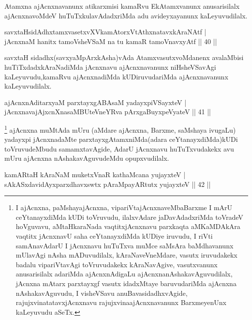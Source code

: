 \begin{artha}
Atamxna ajAcnxnavanunx atikarxmisi kamaRvu EkAtamxvanunx anusarisilalx ajAcnxnavoMdeV huTuTxkulavAdadxriMda adu avideyxayanunx kaLeyuvudilalx.
\end{artha}

\begin{shl}
savxtaHsidAdhxtamxvasetxvXVkamAtorxVtAthxnatavxkAraNAtf |\\
jAcnxnaM hanitx tamoV\s sheVSaM na tu kamaR tamoVnavxyAtf \hfill || 40 ||
\end{shl}

\begin{artha}
savxtaH sidadhx(savxyaMpArxkAsha)vAda AtamxvasutxvoMdanenx avalaMbisi huTiTxdadxkAraNadiMda jAcnxnavu ajAcnxnavanunx niHsheVSavAgi kaLeyuvudu,kamaRvu ajAcnxnadiMda kUDiruvudariMda ajAcnxnavanunx kaLeyuvudilalx.
\end{artha}

\begin{shl}
ajAcnxnAditarxyaM parxtayxgABAsaM yadayxpiVSayxteV |\\
jAcnxnavajAjxcnXnasaMBUteVneYRva pArxgaBuyxpeVyateV \hfill || 41 ||
\end{shl}

\begin{artha}
\footnote{I ajAcnxna, paMshayajAcnxna, vipariVtajAcnxnaveMbaBarxme I mArU ceYtanayxdiMda kUDi toVruvudu, ilalxvAdare jaDavAdadxriMda toVradeV hoVguvavu, aMtaHkaraNada vaqtitxjAcnxnavu parxkaqta aMKaMDAkAra vaqtitx jAcnxnavU saha ceYtanayxdiMda kUDiye iruvudu, I riVti samAnavAdarU I jAcnxnavu huTuTxva muMce saMsAra baMdhavanunx mUlavAgi nAsha mADuvudilalx, kAraNaveVneMdare, vasutx iruvudakekx badalu vipariVtavAgi toVruvudakekx kAraNavAgive, vasutxvanunx anusarisilalx adariMda ajAcnxnAdigaLu ajAcnxnanAshakavAguvudilalx, jAcnxna  mAtarx parxtayxgf vasutx idadxMtaye baruvudariMda ajAcnxna nAshakavAguvudu, I visheVSavu anuBavasidadhxvAgide, rajujxvinatatavxjAcnxnavu rajujxvinaajAcnxnavanunx BarxmeyenUnx kaLeyuvudu aSeTx.} ajAcnxna muMtAda mUru (aMdare ajAcnxna, Barxme, saMshaya ivugaLu) yadayxpi jAcnxnadaMte parxtayxgAtamxniMda(adara ceYtanayxdiMda)kUDi toVruvudeMbudu samamxtavAgide, AdarU jAcnxnavu huTuTxvudakekx avu mUru ajAcnxna nAshakavAguvudeMdu opupxvudilalx.
\end{artha}

\begin{shl}
kamARtaH kAraNaM muketxVnaR kathaMcana yujayxteV |\\
sAkASxdavidAyxparxdhavxswtx pAraMpayARtutx yujayxteV \hfill || 42 ||
\end{shl}


